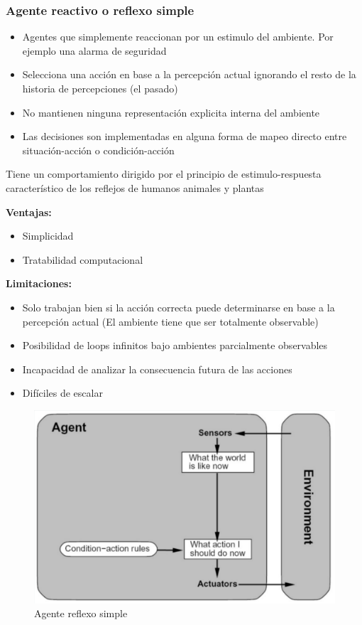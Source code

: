 \subsubsection*{Agente reactivo o reflexo simple}
\begin{itemize}
  \item Agentes que simplemente reaccionan por un estimulo del ambiente. Por ejemplo una alarma de seguridad
  \item Selecciona una acción en base a la percepción actual ignorando el resto de la historia de percepciones (el pasado)
  \item No mantienen ninguna representación explicita interna del ambiente
  \item Las decisiones son implementadas en alguna forma de mapeo directo entre situación-acción o condición-acción
\end{itemize}

Tiene un comportamiento dirigido por el principio de estimulo-respuesta característico de los reflejos de humanos animales y plantas

\textbf{Ventajas: }
\begin{itemize}
  \item Simplicidad
  \item Tratabilidad computacional
\end{itemize}

\textbf{Limitaciones: }
\begin{itemize}
  \item Solo trabajan bien si la acción correcta puede determinarse en base a la percepción actual (El ambiente tiene que ser totalmente observable)
  \item Posibilidad de loops infinitos bajo ambientes parcialmente observables
  \item Incapacidad de analizar la consecuencia futura de las acciones
  \item Difíciles de escalar
\end{itemize}

\begin{figure}
  \centering
  \includegraphics[width=16cm, scale=1]{Images/Imagenes/AgenteReflexoSimple.png}
  \caption{Agente reflexo simple}
\end{figure}

